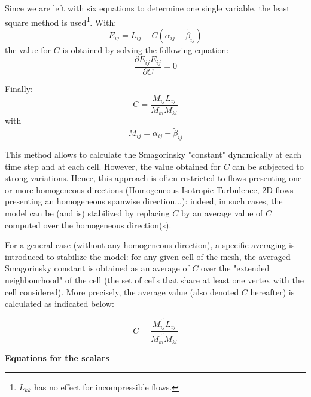 Since we are left with six equations to determine one single variable, the
least square method is used\footnote{$L_{kk}$ has no effect for
incompressible flows.}. With:
\[
E_{ij} = L_{ij}-C(\alpha_{ij} - \widetilde{\beta}_{ij})
\]
the value for $C$ is obtained by solving the following equation:
\[
\frac {\partial E_{ij}E_{ij}}{\partial C} = 0
\]

Finally:
\[
C = \frac{M_{ij}L_{ij}} {M_{kl}M_{kl}}
\]
with
\[
M_{ij} = \alpha_{ij} - \widetilde{\beta}_{ij}
\]

This method allows to calculate the Smagorinsky "constant" dynamically at
each time step and at each cell. However, the value obtained for $C$ can be
subjected to strong variations. Hence, this approach is often restricted to
flows presenting one or more homogeneous directions (Homogeneous Isotropic
Turbulence, 2D flows presenting an homogeneous spanwise direction...):
indeed, in such cases, the model can be (and is) stabilized by replacing $C$
by an average value of $C$ computed over the homogeneous direction(s).

For a general case (without any homogeneous direction), a specific averaging
is introduced to stabilize the model: for any given cell of the mesh, the
averaged Smagorinsky constant is obtained as an average of $C$ over the
"extended neighbourhood" of the cell (the set of cells that share at least
one vertex with the cell considered). More precisely, the average value
(also denoted $C$ hereafter) is calculated as indicated below:

\[
C = \frac{\widetilde{M_{ij}L_{ij}}} {\widetilde{M_{kl}M_{kl}}}
\]

\clearpage \textbf{Equations for the scalars}

